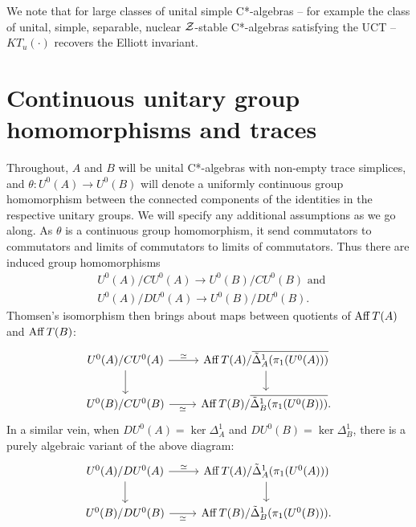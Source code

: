 \documentclass[12pt]{amsart}
\begin{document}
We note that for large classes of unital simple C*-algebras -- for example the class of unital, simple, separable, nuclear $\mathcal{Z}$-stable C*-algebras satisfying the UCT -- $KT_u(\cdot)$ recovers the Elliott invariant. 

\section{Continuous unitary group homomorphisms and traces}\label{section:ugh-ctugh-and-traces}

\hspace{\parindent}Throughout, $A$ and $B$ will be unital C*-algebras with non-empty trace simplices, and $\theta: U^0(A) \to U^0(B)$ will denote a uniformly continuous group homomorphism between the connected components of the identities in the  respective unitary groups. We will specify any additional assumptions as we go along. As $\theta$ is a continuous group homomorphism, it send commutators to commutators and limits of commutators to limits of commutators. Thus there are induced group homomorphisms
\begin{equation}
\begin{split}
&U^0(A)/CU^0(A) \to U^0(B)/CU^0(B) \text{ and }\\
&U^0(A)/DU^0(A) \to U^0(B)/DU^0(B).
\end{split}
\end{equation}
Thomsen's isomorphism \cite[Theorem 3]{Thomsen95} then brings about maps between quotients of $\operatorname{Aff} T(A)$ and $\operatorname{Aff} T(B)$:
\begin{equation}\label{eq:ch-commute}
\begin{tikzcd}
U^0(A)/CU^0(A) \arrow[r, "\simeq"] \arrow[d] & \Aff T(A)/\ov{\tD_A^1(\pi_1(U^0(A)))} \arrow[d] \\
U^0(B)/CU^0(B) \arrow[r, "\simeq"']          & \Aff T(B)/\ov{\tD_B^1(\pi_1(U^0(B)))}     .    
\end{tikzcd}
\end{equation}
In a similar vein, when $DU^0(A) = \ker\Delta_A^1$ and $DU^0(B) = \ker\Delta_B^1$, there is a purely algebraic variant of the above diagram:
\begin{equation}\label{eq:h-commute}
\begin{tikzcd}
U^0(A)/DU^0(A) \arrow[r, "\simeq"] \arrow[d] & \Aff T(A)/\tD_A^1(\pi_1(U^0(A))) \arrow[d] \\
U^0(B)/DU^0(B) \arrow[r, "\simeq"']          & \Aff T(B)/\tD_B^1(\pi_1(U^0(B))).
\end{tikzcd}
\end{equation}
\end{document}
